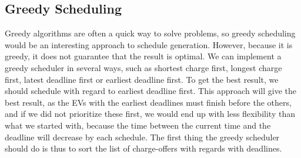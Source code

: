 \subsection{Greedy Scheduling}\label{sec:greedyschedanal}
Greedy algorithms are often a quick way to solve problems, so greedy scheduling would be an interesting approach to schedule generation. However, because it is greedy, it does not guarantee that the result is optimal. We can implement a greedy scheduler in several ways, such as shortest charge first, longest charge first, latest deadline first or earliest deadline first. To get the best result, we should schedule with regard to earliest deadline first. This approach will give the best result, as the EVs with the earliest deadlines must finish before the others, and if we did not prioritize these first, we would end up with less flexibility than what we started with, because the time between the current time and the deadline will decrease by each schedule. The first thing the greedy scheduler should do is thus to sort the list of charge-offers with regards with deadlines. 




